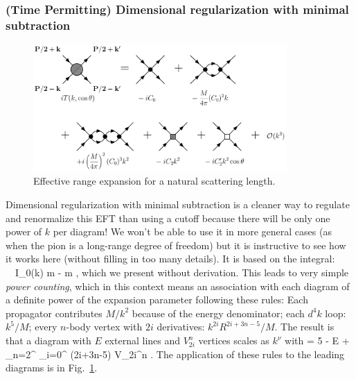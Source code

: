 \subsubsection{(Time Permitting) Dimensional regularization with minimal subtraction}


  \begin{figure}[tbh]
  \begin{center}
    \includegraphics[width=3.8in]{figures/fig_ere}
    \caption{Effective range expansion for a natural scattering length.}
    \label{fig:dimreg_expand}
  \end{center}
  \end{figure}


Dimensional regularization with minimal subtraction is
      a cleaner way to regulate and renormalize this
EFT than using a cutoff because there will be only one power of $k$ per diagram!
We won't be able to use it in more general cases (as when the pion is
a long-range degree of freedom) but it is instructive to see how it
works here (without filling in too many details).
 It is based on the integral:      
 \beq
   \ \Longrightarrow\ 
  I_0(k) \equiv m\int\!  
     \underset{D\rightarrow 3}{\longrightarrow} 
       - m \;,
 \eeq
 which we present without derivation.
This leads to very simple \emph{power counting}, which in this context
means an association with each diagram of a definite power of the expansion
parameter following these rules:
   \bi
    \I Each propagator contributes $M/k^2$ because of the energy denominator;
    \I each $d^4k$ loop: $k^5/M$;
    \I  every $n$-body vertex with $2i$ derivatives:
     $k^{2i}R^{2i+3n-5}/M$.
The result is that a
diagram with $E$ external lines and $V_{2i}^n$
     vertices scales as $k^\nu$ with
     \beq
       \nu = 5 -  E + \sum_{n=2}^{\infty} \sum_{i=0}^{\infty}
       (2i+3n-5) V_{2i}^n \;.
     \eeq
   \ei
The application of these rules to the leading diagrams is in Fig.~\ref{fig:dimreg_expand}.

